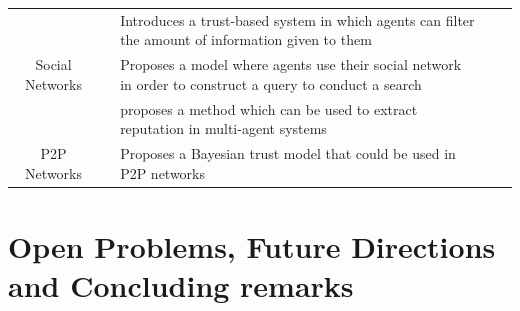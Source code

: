\documentclass[runningheads,a4paper]{llncs}
\begin{document}
\begin{longtable}{|c|c|p{5cm}|p{3cm}|p{1cm}|}
	\multirow{3}{*}{Social Networks}
	& \cite{battiston2006impact}
	& Introduces a trust-based system in which agents can filter the amount of information given to them                    
	&                                 
	&                       
	\\ \cline{2-5}
	& \cite{walter2008model}
	& Proposes a model where agents use their social network in order to construct a query to conduct a search                    
	&                                 
	&                       
	\\ \cline{2-5} 
	& \cite{pujol2002extracting}
	& proposes a method which can be used to extract reputation in multi-agent systems                            
	&                                 
	&                       
	\\ \hline
	
	\multirow{1}{*}{P2P Networks}
	& \cite{wang2003bayesian}
	& Proposes a Bayesian trust model that could be used in P2P networks                
	&                                 
	&                       
	\\ \hline
\end{longtable}

\section{Open Problems, Future Directions and Concluding remarks}
%

\end{document}
